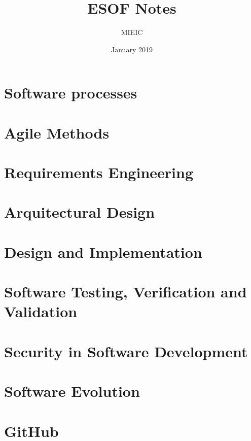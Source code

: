 \documentclass{article}
\title{ESOF Notes}
\author{MIEIC}
\date{January 2019}
\begin{document}
 
\maketitle

\tableofcontents
 
\section{Software processes}


 
\section{Agile Methods}
 


\section{Requirements Engineering}
 


\section{Arquitectural Design}
 


\section{Design and Implementation}
 


\section{Software Testing, Verification and Validation}
 


\section{Security in Software Development}
 


\section{Software Evolution}
 


\section{GitHub}
 

 
\end{document}
